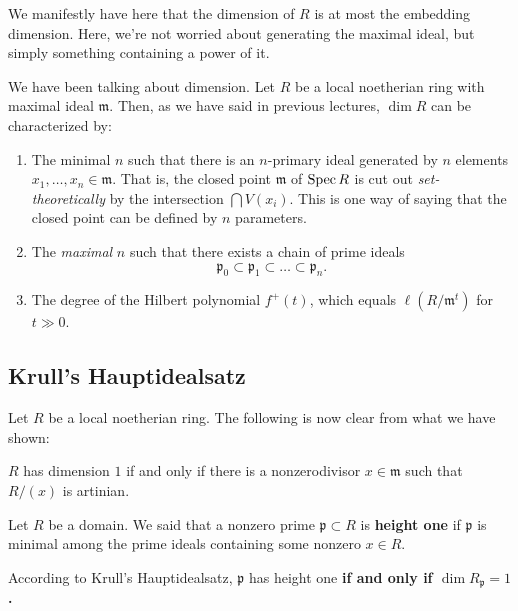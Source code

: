 \begin{remark} 
We manifestly have here that the dimension of $R$ is at most the embedding
dimension. Here, we're not worried about generating the maximal ideal, but
simply something containing a power of it.
\end{remark} 

We have been talking about dimension. Let $R$ be a local noetherian ring with
maximal ideal $\mathfrak{m}$. Then, as we have said in previous lectures, $\dim R$ can be characterized by:
\begin{enumerate}
\item The minimal $n$ such that there is an $n$-primary ideal generated by $n$
elements $x_1, \dots, x_n \in \mathfrak{m}$. That is, the closed point
$\mathfrak{m}$ of
$\operatorname{Spec} R$ is cut out \emph{set-theoretically} by the intersection $\bigcap
V(x_i)$. This is one way of saying that the closed point can be defined by $n$
parameters. 
\item The \emph{maximal} $n$ such that there exists a chain of prime ideals
\[ \mathfrak{p}_0 \subset \mathfrak{p}_1 \subset \dots \subset \mathfrak{p}_n. \]
\item The degree of the Hilbert polynomial $f^+(t)$, which equals
$\ell(R/\mathfrak{m}^t)$ for $t \gg 0$.
\end{enumerate}


\subsection{Krull's Hauptidealsatz}


Let $R$ be a local noetherian ring.
The following is now clear from what we have shown:

\begin{theorem} \label{hauptv1}
$R$ has dimension $1$ if and only if there is a nonzerodivisor $x \in \mathfrak{m}$ such that
$R/(x)$ is artinian.
\end{theorem} 



\begin{remark} 
Let $R$ be a domain. We said that a nonzero prime $\mathfrak{p} \subset R$ is
\textbf{height one} if $\mathfrak{p}$ is minimal among the prime ideals
containing some nonzero $x \in R$. 

According to Krull's Hauptidealsatz, $\mathfrak{p}$ has height one \textbf{if
and only if $\dim R_{\mathfrak{p}} = 1$.}
\end{remark} 


